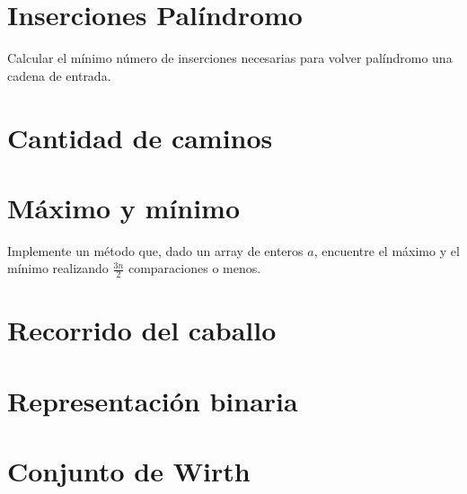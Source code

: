 \section{Inserciones Palíndromo}
Calcular el mínimo número de inserciones necesarias para volver palíndromo una cadena de entrada.

\section{Cantidad de caminos}


\section{Máximo y mínimo}
Implemente un método que, dado un array de enteros \(a\), encuentre el máximo y el mínimo realizando \(\frac{3 n}{2}\) comparaciones o menos.

\section{Recorrido del caballo}


\section{Representación binaria}


\section{Conjunto de Wirth}


% 


% 


